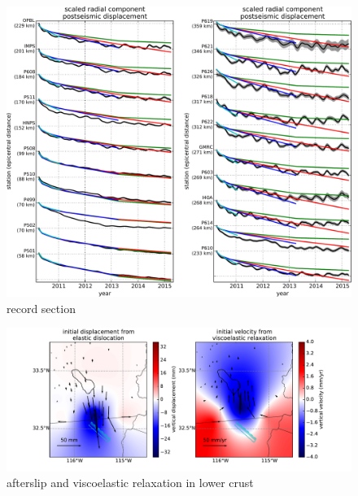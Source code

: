 \documentclass[12pt]{article}
\begin{document}
\begin{figure}
\includegraphics[scale=0.6]{Figures/recordsection1}
\centering 
\caption{record section}
\label{fig:RecordSection1}
\end{figure}

\begin{figure}
\includegraphics[scale=0.6]{Figures/lower_crust}
\centering 
\caption{afterslip and viscoelastic relaxation in lower crust}
\label{fig:LowerCrust}
\end{figure}
\end{document}
